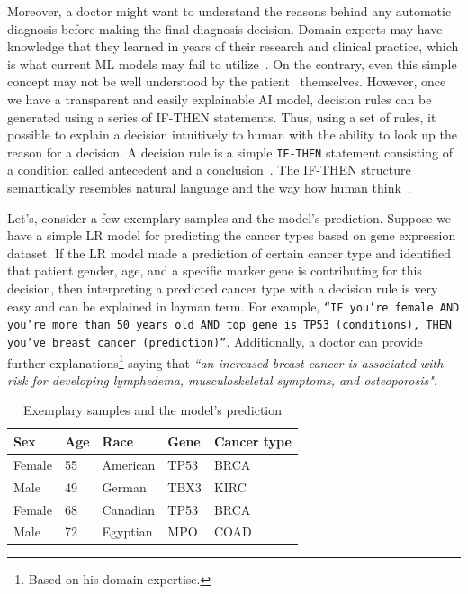 \hspace*{3.5mm} Moreover, a doctor might want to understand the reasons behind any automatic diagnosis before making the final diagnosis decision. Domain experts may have knowledge that they learned in years of their research and clinical practice, which is what current ML models may fail to utilize~\cite{ming2018rulematrix}. 
On the contrary, even this simple concept may not be well understood by the patient~\cite{post2015patient} themselves. However, once we have a transparent and easily explainable AI model, decision rules can be generated using a series of IF-THEN statements. Thus, using a set of rules, it possible to explain a decision intuitively to human with the ability to look up the reason for a decision. A decision rule is a simple \texttt{IF-THEN} statement consisting of a condition called antecedent and a conclusion~\cite{molnar2019interpretable}. The IF-THEN structure semantically resembles natural language and the way how human think~\cite{molnar2019interpretable}. 

\hspace*{3.5mm} Let's, consider a few exemplary samples and the model's prediction. Suppose we have a simple LR model for predicting the cancer types based on gene expression dataset. If the LR model made a prediction of certain cancer type and identified that patient gender, age, and a specific marker gene is contributing for this decision, then interpreting a predicted cancer type with a decision rule is very easy and can be explained in layman term. For example, \texttt{``IF you're female AND you're more than 50 years old AND top gene is TP53~(conditions), THEN you've breast cancer~(prediction)''}. Additionally, a doctor can provide further explanations\footnote{Based on his domain expertise.} saying that \textit{``an increased breast cancer is associated with risk for developing lymphedema, musculoskeletal symptoms, and osteoporosis"}. 

\begin{table}[h!]
    \caption{Exemplary samples and the model's prediction}
    \label{ge:rule_example}
    \vspace{-6mm}
    \begin{center}
        \scriptsize
        \begin{tabular}{l|l|l|l|l}
            \hline
            \rowcolor{Gray}
            \textbf{Sex} & \textbf{Age} & \textbf{Race} & \textbf{Gene} & \textbf{Cancer type} \\\hline    
            Female & 55 & American & TP53 & BRCA \\\hline
            Male & 49 & German & TBX3 & KIRC \\\hline
            Female & 68 & Canadian & TP53 & BRCA \\\hline
            Male & 72 & Egyptian & MPO & COAD \\\hline
        \end{tabular}
        \vspace{-6mm}
    \end{center}
\end{table}

